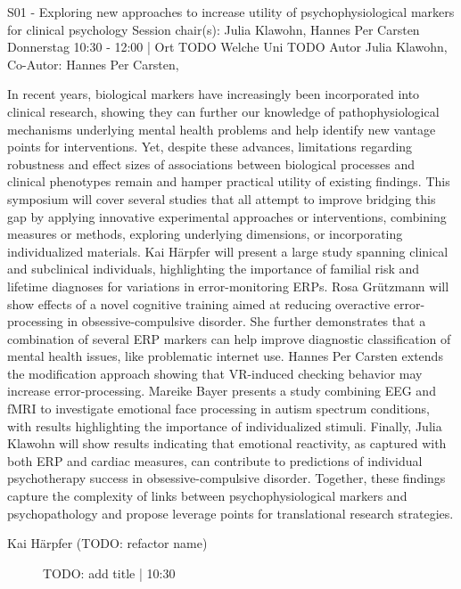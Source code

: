 
            \begin{symposium}
            {S01 - Exploring new approaches to increase utility of psychophysiological markers for clinical psychology}
            {Session chair(s): Julia Klawohn, Hannes Per Carsten}
            {Donnerstag 10:30 - 12:00 | Ort TODO}
            {Welche Uni TODO}
            Autor Julia Klawohn, Co-Autor: Hannes Per Carsten,

In recent years, biological markers have increasingly been incorporated into clinical research, showing they can further our knowledge of pathophysiological mechanisms underlying mental health problems and help identify new vantage points for interventions. Yet, despite these advances, limitations regarding robustness and effect sizes of associations between biological processes and clinical phenotypes remain and hamper practical utility of existing findings. This symposium will cover several studies that all attempt to improve bridging this gap by applying innovative experimental approaches or interventions, combining measures or methods, exploring underlying dimensions, or incorporating individualized materials. Kai Härpfer will present a large study spanning clinical and subclinical individuals, highlighting the importance of familial risk and lifetime diagnoses for variations in error-monitoring ERPs. Rosa Grützmann will show effects of a novel cognitive training aimed at reducing overactive error-processing in obsessive-compulsive disorder. She further demonstrates that a combination of several ERP markers can help improve diagnostic classification of mental health issues, like problematic internet use. Hannes Per Carsten extends the modification approach showing that VR-induced checking behavior may increase error-processing. Mareike Bayer presents a study combining EEG and fMRI to investigate emotional face processing in autism spectrum conditions, with results highlighting the importance of individualized stimuli. Finally, Julia Klawohn will show results indicating that emotional reactivity, as captured with both ERP and cardiac measures, can contribute to predictions of individual psychotherapy success in obsessive-compulsive disorder. Together, these findings capture the complexity of links between psychophysiological markers and psychopathology and propose leverage points for translational research strategies.
            \begin{description}    
            
                \item [Kai Härpfer (TODO: refactor name)] TODO: add title \textcolor{mygray}{ | 10:30}    
                

\end{description}
\end{symposium}
